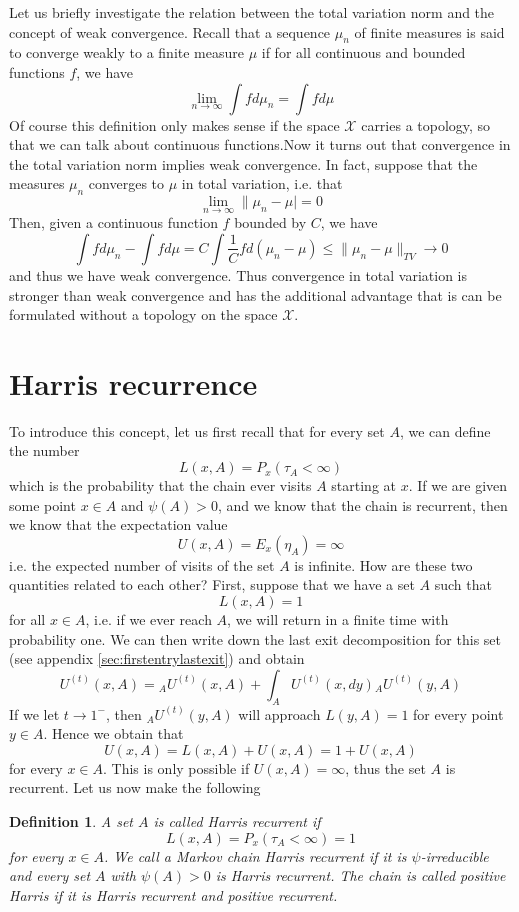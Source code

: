 \documentclass[a4paper, draft]{article}
\theoremstyle{own}
\newtheorem{defn}{Definition}[section]
\theoremstyle{remark}
\begin{document}
Let us briefly investigate the relation between the total variation norm and the concept of weak convergence. Recall that a sequence $\mu_n$ of finite measures is said to converge weakly to a finite measure $\mu$ if for all continuous and bounded functions $f$, we have
$$
\lim_{n \rightarrow \infty} \int f d\mu_n = \int f d\mu
$$
Of course this definition only makes sense if the space ${\mathcal X}$ carries a topology, so that
we can talk about continuous functions.Now it turns out that convergence in the total variation norm implies weak convergence. In fact, suppose that the measures $\mu_n$ converges to $\mu$ in total variation, i.e. that
$$
\lim_{n \rightarrow \infty} \| \mu_n - \mu | = 0
$$
Then, given a continuous function $f$ bounded by $C$, we have
$$
\int f d\mu_n - \int f d\mu = C \int \frac{1}{C} f d(\mu_n - \mu) \leq \| \mu_n - \mu \|_{TV} \rightarrow 0
$$
and thus we have weak convergence. Thus convergence in total variation is stronger than weak convergence and has the additional advantage that is can be formulated without a topology on the space ${\mathcal X}$.

\section{Harris recurrence}\label{sec:harrisrecurrence}

To introduce this concept, let us first recall that for every set $A$, we can define the number
$$
L(x,A) = P_x(\tau_A < \infty) 
$$
which is the probability that the chain ever visits $A$ starting at $x$. If we are given some point $x \in A$ and $\psi(A) > 0$, and we know that the chain is recurrent, then we know that the expectation value 
$$
U(x,A) = E_x(\eta_A) = \infty
$$
i.e. the expected number of visits of the set $A$ is infinite. How are these two quantities related to each other?
First, suppose that we have a set $A$ such that 
$$
L(x,A) = 1
$$
for all $x \in A$, i.e. if we ever reach $A$, we will return in a finite time with probability one. We can then write down the last exit decomposition for this set (see 
appendix \ref{sec:firstentrylastexit}) and obtain
$$
U^{(t)}(x,A) = {_A}U^{(t)}(x,A) + \int_A U^{(t)}(x,dy){_A}U^{(t)}(y,A)
$$
If we let $t \rightarrow 1^-$, then ${_A}U^{(t)}(y,A)$ will approach $L(y,A)=1$ for every
point $y \in A$. Hence we obtain that
$$
U(x,A) = L(x,A) + U(x,A) = 1 + U(x,A)
$$
for every $x \in A$. This is only possible if $U(x,A) = \infty$, thus the set $A$ is recurrent. Let us now make the following

\begin{defn}
	A set $A$ is called {\em Harris recurrent} if 
	$$
	L(x,A) = P_x(\tau_A < \infty) = 1
	$$
	for every $x \in A$. We call a Markov chain Harris recurrent if it is $\psi$-irreducible
	and every set $A$ with $\psi(A) > 0$ is Harris recurrent. The chain is called {\em positive Harris} if it is Harris recurrent and positive recurrent.
	
\end{defn}
\end{document}
